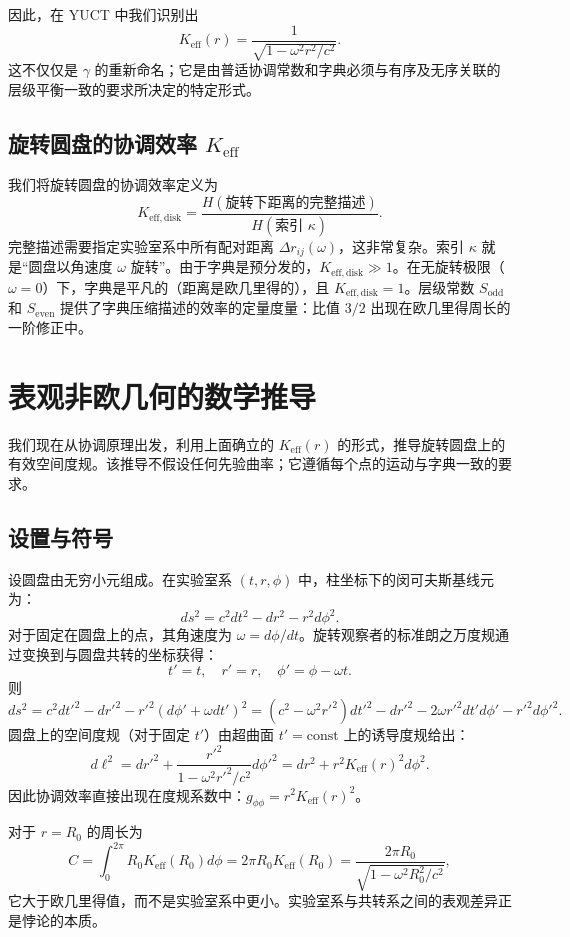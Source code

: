 \documentclass[12pt,a4paper]{article}
\newcommand{\Sodd}{S_{\mathrm{odd}}}
\newcommand{\Seven}{S_{\mathrm{even}}}
\begin{document}
	因此，在 YUCT 中我们识别出
	\[
	\boxed{K_{\mathrm{eff}}(r) = \frac{1}{\sqrt{1 - \omega^2 r^2/c^2}}}.
	\]
	这不仅仅是 \(\gamma\) 的重新命名；它是由普适协调常数和字典必须与有序及无序关联的层级平衡一致的要求所决定的特定形式。
	
	\subsection{旋转圆盘的协调效率 \(K_{\mathrm{eff}}\)}
	\label{subsec:keff-disk}
	
	我们将旋转圆盘的协调效率定义为
	\[
	K_{\mathrm{eff,disk}} = \frac{H(\text{旋转下距离的完整描述})}{H(\text{索引 } \kappa)}.
	\]
	完整描述需要指定实验室系中所有配对距离 \(\Delta r_{ij}(\omega)\)，这非常复杂。索引 \(\kappa\) 就是“圆盘以角速度 \(\omega\) 旋转”。由于字典是预分发的，\(K_{\mathrm{eff,disk}} \gg 1\)。在无旋转极限（\(\omega = 0\)）下，字典是平凡的（距离是欧几里得的），且 \(K_{\mathrm{eff,disk}} = 1\)。层级常数 \(\Sodd\) 和 \(\Seven\) 提供了字典压缩描述的效率的定量度量：比值 \(3/2\) 出现在欧几里得周长的一阶修正中。
	
	\section{表观非欧几何的数学推导}
	\label{sec:derivation}
	
	我们现在从协调原理出发，利用上面确立的 \(K_{\mathrm{eff}}(r)\) 的形式，推导旋转圆盘上的有效空间度规。该推导不假设任何先验曲率；它遵循每个点的运动与字典一致的要求。
	
	\subsection{设置与符号}
	设圆盘由无穷小元组成。在实验室系 \((t, r, \phi)\) 中，柱坐标下的闵可夫斯基线元为：
	\[
	ds^2 = c^2 dt^2 - dr^2 - r^2 d\phi^2.
	\]
	对于固定在圆盘上的点，其角速度为 \(\omega = d\phi/dt\)。旋转观察者的标准朗之万度规通过变换到与圆盘共转的坐标获得：
	\[
	t' = t,\quad r' = r,\quad \phi' = \phi - \omega t.
	\]
	则
	\[
	ds^2 = c^2 dt'^2 - dr'^2 - r'^2 (d\phi' + \omega dt')^2 = (c^2 - \omega^2 r'^2) dt'^2 - dr'^2 - 2\omega r'^2 dt' d\phi' - r'^2 d\phi'^2.
	\]
	圆盘上的空间度规（对于固定 \(t'\)）由超曲面 \(t' = \text{const}\) 上的诱导度规给出：
	\[
	d\ell^2 = dr'^2 + \frac{r'^2}{1 - \omega^2 r'^2/c^2} d\phi'^2 = dr^2 + r^2 K_{\mathrm{eff}}(r)^2 d\phi^2.
	\]
	因此协调效率直接出现在度规系数中：\(g_{\phi\phi} = r^2 K_{\mathrm{eff}}(r)^2\)。
	
	对于 \(r = R_0\) 的周长为
	\[
	C = \int_0^{2\pi} R_0 K_{\mathrm{eff}}(R_0) d\phi = 2\pi R_0 K_{\mathrm{eff}}(R_0) = \frac{2\pi R_0}{\sqrt{1 - \omega^2 R_0^2/c^2}},
	\]
	它大于欧几里得值，而不是实验室系中更小。实验室系与共转系之间的表观差异正是悖论的本质。
	
\end{document}
